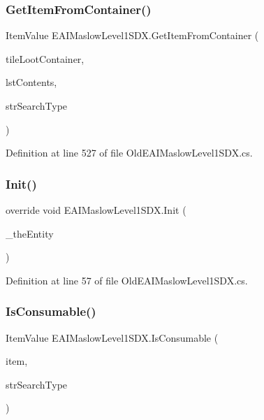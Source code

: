 \mbox{\label{class_e_a_i_maslow_level1_s_d_x_ae5b58b99162f636b87640eaea4bd9763}} 
\subsubsection{\texorpdfstring{GetItemFromContainer()}{GetItemFromContainer()}}
{\footnotesize\ttfamily Item\+Value E\+A\+I\+Maslow\+Level1\+S\+D\+X.\+Get\+Item\+From\+Container (\begin{DoxyParamCaption}\item[{Tile\+Entity\+Loot\+Container}]{tile\+Loot\+Container,  }\item[{List$<$ String $>$}]{lst\+Contents,  }\item[{String}]{str\+Search\+Type }\end{DoxyParamCaption})}



Definition at line 527 of file Old\+E\+A\+I\+Maslow\+Level1\+S\+D\+X.\+cs.

\mbox{\label{class_e_a_i_maslow_level1_s_d_x_ae672f6b8718ec477f3e978eab63fa534}} 
\subsubsection{\texorpdfstring{Init()}{Init()}}
{\footnotesize\ttfamily override void E\+A\+I\+Maslow\+Level1\+S\+D\+X.\+Init (\begin{DoxyParamCaption}\item[{Entity\+Alive}]{\+\_\+the\+Entity }\end{DoxyParamCaption})}



Definition at line 57 of file Old\+E\+A\+I\+Maslow\+Level1\+S\+D\+X.\+cs.

\mbox{\label{class_e_a_i_maslow_level1_s_d_x_a64862ccd699018e8ad815d21fdd58989}} 
\subsubsection{\texorpdfstring{IsConsumable()}{IsConsumable()}}
{\footnotesize\ttfamily Item\+Value E\+A\+I\+Maslow\+Level1\+S\+D\+X.\+Is\+Consumable (\begin{DoxyParamCaption}\item[{Item\+Value}]{item,  }\item[{String}]{str\+Search\+Type }\end{DoxyParamCaption})}



